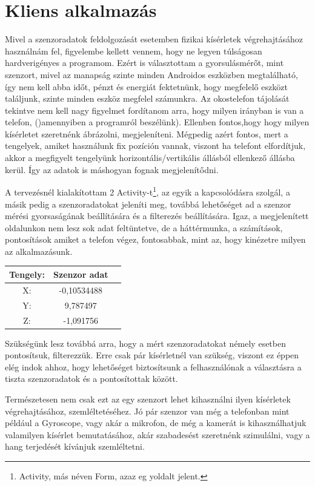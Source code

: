\documentclass{thesis-ekf}
\theoremstyle{definition}
\theoremstyle{remark}
\begin{document}
\chapter{Kliens alkalmazás}
Mivel a szenzoradatok feldolgozását esetemben fizikai kísérletek végrehajtásához használnám fel, figyelembe kellett vennem, hogy ne legyen túlságosan hardverigényes a programom. Ezért is választottam a gyorsulásmérőt, mint szenzort, mivel az manapság szinte minden Androidos eszközben megtalálható, így nem kell abba időt, pénzt és energiát fektetnünk, hogy megfelelő eszközt találjunk, szinte minden eszköz megfelel számunkra. Az okostelefon tájolását tekintve nem kell nagy figyelmet fordítanom arra, hogy milyen irányban is van a telefon, ()amennyiben a programról beszélünk). Ellenben fontos,hogy hogy milyen kísérletet szeretnénk ábrázolni, megjeleníteni. Mégpedig azért fontos, mert a tengelyek, amiket használunk fix pozíción vannak, viszont ha telefont elfordítjuk, akkor a megfigyelt tengelyünk horizontális/vertikális állásból ellenkező állásba kerül. Így az adatok is máshogyan fognak megjelenítődni.
\par A tervezésnél kialakítottam 2 Activity-t\footnote{Activity, más néven Form, azaz eg yoldalt jelent.}, az egyik a kapcsolódásra szolgál, a másik pedig a szenzoradatokat jeleníti meg, továbbá lehetőséget ad a szenzor mérési gyorsaságának beállítására és a filterezés beállítására. Igaz, a megjelenített oldalunkon nem lesz sok adat feltüntetve, de a háttérmunka, a számítások, pontosítások amiket a telefon végez, fontosabbak, mint az, hogy kinézetre milyen az alkalmazásunk.
\begin{center}
	\begin{tabular}{ |c|c|c| } 
		\hline
		Tengely: & Szenzor adat \\
		\hline\hline
		X: & -0,10534488  \\
		\hline
		Y: & 9,787497 \\
		\hline
		Z: & -1,091756 \\
		\hline
	\end{tabular}
\end{center}
\par Szükségünk lesz továbbá arra, hogy a mért szenzoradatokat némely esetben pontosítsuk, filterezzük. Erre csak pár kísérletnél van szükség, viszont ez éppen elég indok ahhoz, hogy lehetőséget biztosítsunk a felhasználónak a választásra a tiszta szenzoradatok és a pontosítottak között.
\par Természetesen nem csak ezt az egy szenzort lehet kihasználni ilyen kísérletek végrehajtásához, szemléltetéséhez. Jó pár szenzor van még a telefonban mint például a Gyroscope, vagy akár a mikrofon, de még a kamerát is kihasználhatjuk valamilyen kísérlet bemutatásához, akár szabadesést szeretnénk szimulálni, vagy a hang terjedését kívánjuk szemléltetni.
\end{document}
